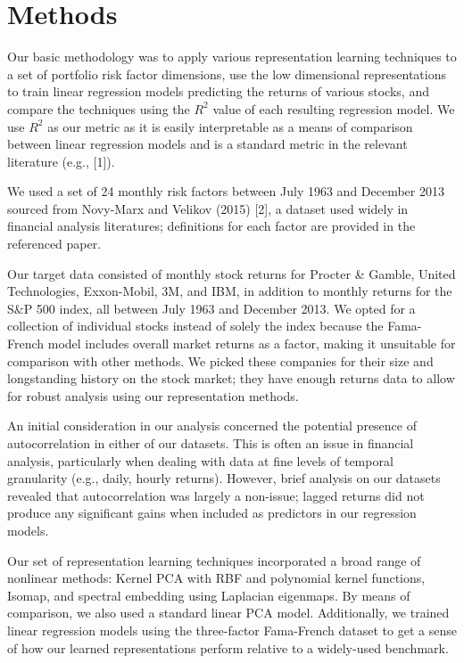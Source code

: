 \documentclass[a4paper]{article}
\begin{document}
   \section{Methods}
   \par Our basic methodology was to apply various representation learning techniques to a set of portfolio risk factor dimensions, use the low dimensional representations to train linear regression models predicting the returns of various stocks, and compare the techniques using the $R^2$ value of each resulting regression model. We use $R^2$ as our metric as it is easily interpretable as a means of comparison between linear regression models and is a standard metric in the relevant literature (e.g., [1]). 
   \par We used a set of 24 monthly risk factors between July 1963 and December 2013 sourced from Novy-Marx and Velikov (2015) [2], a dataset used widely in financial analysis literatures; definitions for each factor are provided in the referenced paper.
   \par Our target data consisted of monthly stock returns for Procter \& Gamble, United Technologies, Exxon-Mobil, 3M, and IBM, in addition to monthly returns for the S\&P 500 index, all between July 1963 and December 2013. We opted for a collection of individual stocks instead of solely the index because the Fama-French model includes overall market returns as a factor, making it unsuitable for comparison with other methods. We picked these companies for their size and longstanding history on the stock market; they have enough returns data to allow for robust analysis using our representation methods.
   \par An initial consideration in our analysis concerned the potential presence of autocorrelation in either of our datasets. This is often an issue in financial analysis, particularly when dealing with data at fine levels of temporal granularity (e.g., daily, hourly returns). However, brief analysis on our datasets revealed that autocorrelation was largely a non-issue; lagged returns did not produce any significant gains when included as predictors in our regression models. 
   \par Our set of representation learning techniques incorporated a broad range of nonlinear methods: Kernel PCA with RBF and polynomial kernel functions, Isomap, and spectral embedding using Laplacian eigenmaps. By means of comparison, we also used a standard linear PCA model. Additionally, we trained linear regression models using the three-factor Fama-French dataset to get a sense of how our learned representations perform relative to a widely-used benchmark.
\end{document}
